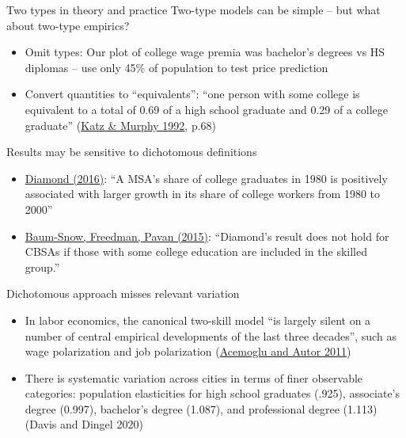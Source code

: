 \documentclass[11pt,notes=hide,aspectratio=169]{beamer}
\begin{document}
\begin{frame}{Two types in theory and practice}
Two-type models can be simple -- but what about two-type empirics?
\begin{itemize}
	\item Omit types: Our plot of college wage premia was bachelor's degrees vs HS diplomas -- use only 45\% of population to test price prediction
	\item Convert quantities to ``equivalents'': ``one person with some college is equivalent to a total of 0.69 of a high school graduate and 0.29 of a college graduate'' (\href{http://www.jstor.org/stable/2118323}{Katz \& Murphy 1992}, p.68)
\end{itemize}
\pause Results may be sensitive to dichotomous definitions
\begin{itemize}
	\item \href{https://www.aeaweb.org/articles?id=10.1257/aer.20131706}{Diamond (2016)}: ``A MSA's share of college graduates in 1980 is positively associated with larger growth in its share of college workers from 1980 to 2000''
	\item \href{https://www.aeaweb.org/articles?id=10.1257/app.20160510}{Baum-Snow, Freedman, Pavan (2015)}: ``Diamond's result does not hold for CBSAs if those with some college education are included in the skilled group.''
\end{itemize}
\end{frame}
\begin{frame}{Dichotomous approach misses relevant variation}
\begin{itemize}
	\item In labor economics, the canonical two-skill model ``is largely silent on a number of central empirical developments of the last three decades'', such as wage polarization and job polarization (\href{http://www.sciencedirect.com/science/article/pii/S0169721811024105}{Acemoglu and Autor 2011})
	\item There is systematic variation across cities in terms of finer observable categories: population elasticities for high school graduates (.925), associate's degree (0.997), bachelor's degree (1.087), and professional degree (1.113) (Davis and Dingel 2020)
\end{itemize}
\end{frame}
\end{document}
